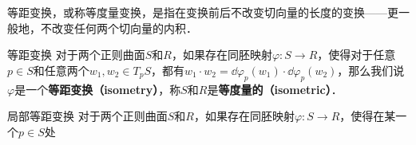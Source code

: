 

等距变换，或称等度量变换，是指在变换前后不改变切向量的长度的变换——更一般地，不改变任何两个切向量的内积．

\begin{definition}{等距变换}
对于两个正则曲面$S$和$R$，如果存在同胚映射$\varphi:S\to R$，使得对于任意$p\in S$和任意两个$w_1, w_2\in T_pS$，都有$w_1\cdot w_2=\dd\varphi_p(w_1)\cdot\dd\varphi_p(w_2)$，那么我们说$\varphi$是一个\textbf{等距变换（isometry）}，称$S$和$R$是\textbf{等度量的（isometric）}．
\end{definition}

\begin{definition}{局部等距变换}
对于两个正则曲面$S$和$R$，如果存在同胚映射$\varphi:S\to R$，使得在某一个$p\in S$处
\end{definition}






